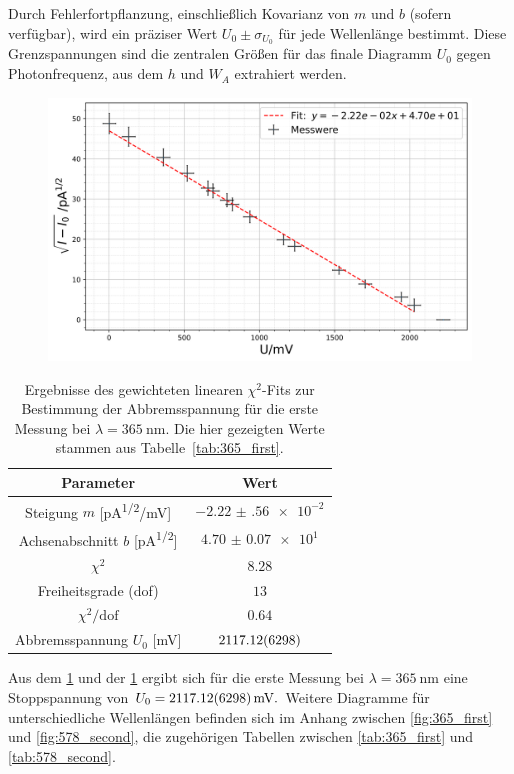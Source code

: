 Durch Fehlerfortpflanzung, einschließlich Kovarianz von $m$ und $b$ (sofern verfügbar), wird ein präziser Wert $U_{0}\pm\sigma_{U_{0}}$ für jede Wellenlänge bestimmt. Diese Grenzspannungen sind die zentralen Größen für das finale Diagramm $U_{0}$ gegen Photonfrequenz, aus dem $h$ und $W_{A}$ extrahiert werden.
\FloatBarrier
\begin{figure}[H]
    \centering
    \includegraphics[width=0.95\linewidth]{figs/365_1.png}
    \label{fig:365_first_photoeff}
\end{figure}
\begin{table}[H]
  \centering
  \begin{tabular}{|c|c|}
    \hline
    \textbf{Parameter} & \textbf{Wert} \\ \hline
    Steigung $m$ [\si{\pico\ampere^{1/2}/\milli\volt}]
      & $\num{-2.22(56)e-2}$ \\ \hline
    Achsenabschnitt $b$ [\si{\pico\ampere^{1/2}}]
      & $\num{4.70(7)e1}$ \\ \hline
    $\chi^2$
      & $\num{8.28}$ \\ \hline
    Freiheitsgrade (dof)
      & $\num{13}$ \\ \hline
    $\chi^2/\mathrm{dof}$
      & $\num{0.64}$ \\ \hline
    Abbremsspannung $U_0$ [\si{\milli\volt}]
      & $\num{2117.12 \pm 62.98}$ \\ \hline
  \end{tabular}
  \caption{Ergebnisse des gewichteten linearen $\chi^2$-Fits zur Bestimmung der Abbremsspannung für die erste Messung bei $\lambda=\SI{365}{\nano\metre}$. Die hier gezeigten Werte stammen aus Tabelle~\ref{tab:365_first}.}
  \label{tab:365_first_chi2_photoeff}
\end{table}
\FloatBarrier
Aus dem \cref{fig:365_first_photoeff} und der \cref{tab:365_first_chi2_photoeff} ergibt sich für die erste Messung bei $\lambda = \SI{365}{\nano\meter}$ eine Stoppspannung von $U_0 = \SI{2117.12 \pm 62.98}{\milli\volt}.$ Weitere Diagramme für unterschiedliche Wellenlängen befinden sich im Anhang zwischen \cref{fig:365_first} und \cref{fig:578_second}, die zugehörigen Tabellen zwischen \cref{tab:365_first} und \cref{tab:578_second}.\\


